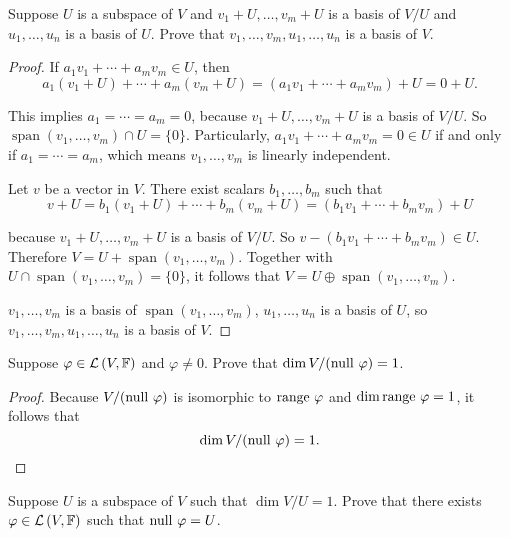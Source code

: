 \begin{exercise}
    Suppose $U$ is a subspace of $V$ and $v_{1} + U, \ldots, v_{m} + U$ is a basis of $V/U$ and $u_{1} , \ldots, u_{n}$ is a basis of $U$. Prove that $v_{1} , \ldots, v_{m} , u_{1} , \ldots, u_{n}$ is a basis of $V$.
\end{exercise}

\begin{proof}
    If $a_{1}v_{1} + \cdots + a_{m}v_{m} \in U$, then
    \[
        a_{1}(v_{1} + U) + \cdots + a_{m}(v_{m} + U) = (a_{1}v_{1} + \cdots + a_{m}v_{m}) + U = 0 + U.
    \]

    This implies $a_{1} = \cdots = a_{m} = 0$, because $v_{1} + U, \ldots, v_{m} + U$ is a basis of $V/U$. So $\operatorname{span}(v_{1}, \ldots, v_{m})\cap U = \{0\}$. Particularly, $a_{1}v_{1} + \cdots + a_{m}v_{m} = 0\in U$ if and only if $a_{1} = \cdots = a_{m}$, which means $v_{1}, \ldots, v_{m}$ is linearly independent.

    Let $v$ be a vector in $V$. There exist scalars $b_{1}, \ldots, b_{m}$ such that
    \[
        v + U = b_{1}(v_{1} + U) + \cdots + b_{m}(v_{m} + U) = (b_{1}v_{1} + \cdots + b_{m}v_{m}) + U
    \]

    because $v_{1} + U, \ldots, v_{m} + U$ is a basis of $V/U$. So $v - (b_{1}v_{1} + \cdots + b_{m}v_{m})\in U$. Therefore $V = U + \operatorname{span}(v_{1}, \ldots, v_{m})$. Together with $U\cap \operatorname{span}(v_{1}, \ldots, v_{m}) = \{0\}$, it follows that $V = U \oplus \operatorname{span}(v_{1}, \ldots, v_{m})$.

    $v_{1}, \ldots, v_{m}$ is a basis of $\operatorname{span}(v_{1}, \ldots, v_{m})$, $u_{1}, \ldots, u_{n}$ is a basis of $U$, so $v_{1} , \ldots, v_{m} , u_{1} , \ldots, u_{n}$ is a basis of $V$.
\end{proof}
\newpage

\begin{exercise}
    Suppose $\varphi \in \mathcal{L}\left({V,\mathbb{F}}\right)$ and $\varphi\ne 0$. Prove that $\dim V/(\operatorname{null}\,{\varphi}) = 1$.
\end{exercise}

\begin{proof}
    Because $V/(\operatorname{null}\,{\varphi})$ is isomorphic to $\operatorname{range}\,{\varphi}$ and $\dim\operatorname{range}\,{\varphi} = 1$, it follows that
    \[
        \dim V/(\operatorname{null}\,{\varphi}) = 1.\qedhere
    \]
\end{proof}
\newpage

\begin{exercise}
    Suppose $U$ is a subspace of $V$ such that $\dim V/U = 1$. Prove that there exists $\varphi \in \mathcal{L}\left({V, \mathbb{F}}\right)$ such that $\operatorname{null}\,{\varphi} = U$.
\end{exercise}

